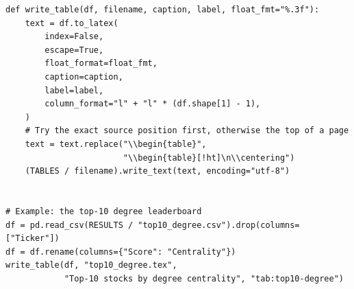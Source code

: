 \begin{lstlisting}[style=python]
def write_table(df, filename, caption, label, float_fmt="%.3f"):
    text = df.to_latex(
        index=False,
        escape=True,
        float_format=float_fmt,
        caption=caption,
        label=label,
        column_format="l" + "l" * (df.shape[1] - 1),
    )
    # Try the exact source position first, otherwise the top of a page
    text = text.replace("\\begin{table}",
                        "\\begin{table}[!ht]\n\\centering")
    (TABLES / filename).write_text(text, encoding="utf-8")


# Example: the top-10 degree leaderboard
df = pd.read_csv(RESULTS / "top10_degree.csv").drop(columns=["Ticker"])
df = df.rename(columns={"Score": "Centrality"})
write_table(df, "top10_degree.tex",
            "Top-10 stocks by degree centrality", "tab:top10-degree")
\end{lstlisting}
